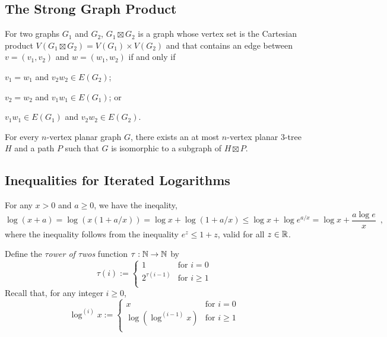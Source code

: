 \documentclass[kpfonts]{patmorin}
\theoremstyle{named}
\begin{document}
\subsection{The Strong Graph Product}

For two graphs $G_1$ and $G_2$, $G_1\boxtimes G_2$ is a graph whose vertex set is the Cartesian product $V(G_1\boxtimes G_2)= V(G_1)\times V(G_2)$ and that contains an edge between $v=(v_1,v_2)$ and $w=(w_1,w_2)$ if and only if
\begin{inparaenum}[(i)]
    \item $v_1=w_1$ and $v_2w_2\in E(G_2)$;
    \item $v_2=w_2$ and $v_1w_1\in E(G_1)$; or
    \item $v_1w_1\in E(G_1)$ and $v_2w_2\in E(G_2)$.
\end{inparaenum}

\begin{thm}\cite{dujmovic.joret.ea:planar}\label{product-structure}
    For every $n$-vertex planar graph $G$, there exists an at most $n$-vertex planar 3-tree $H$ and a path $P$ such that $G$ is isomorphic to a subgraph of $H\boxtimes P$.
\end{thm}

\subsection{Inequalities for Iterated Logarithms}

For any $x> 0$ and $a\ge 0$, we have the ineqality,
\begin{equation}
    \log (x+a) = \log (x(1+a/x)) = \log x + \log(1+a/x) \le \log x + \log e^{a/x} = \log x + \frac{a\log e}{x} \enspace , \label{log-x-plus-a}
\end{equation}
where the inequality follows from the inequality $e^z \le 1+z$, valid for all $z\in\mathbb{R}$.

Define the \emph{$\tau$ower of $\tau$wos} function $\tau:\mathbb{N}\to\mathbb{N}$ by
\[
  \tau(i) :=
    \begin{cases}
        1 & \text{for $i=0$} \\
        2^{\tau(i-1)} & \text{for $i\ge 1$} \\
    \end{cases}
\]
Recall that, for any integer $i\ge 0$,
\[
    \log^{(i)} x :=
      \begin{cases}
          x & \text{for $i=0$} \\
          \log\left(\log^{(i-1)}x\right) & \text{for $i\ge 1$} \\
      \end{cases}
\]
\end{document}
